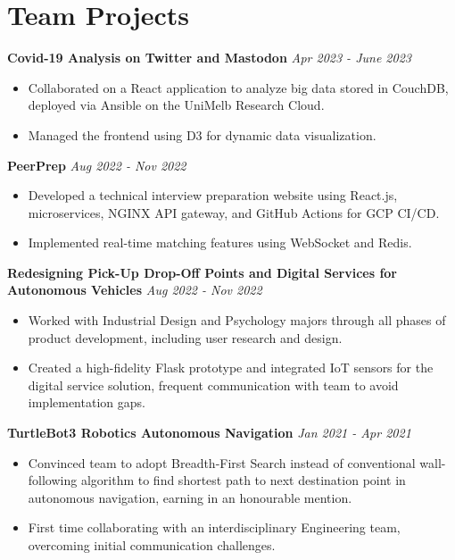 \documentclass[a4paper,10pt]{article}
\begin{document}
\section*{Team Projects}
\textbf{Covid-19 Analysis on Twitter and Mastodon} \hfill \textit{Apr 2023 - June 2023}
\begin{itemize}[leftmargin=*]
    \item Collaborated on a React application to analyze big data stored in CouchDB, deployed via Ansible on the UniMelb Research Cloud.
    \item Managed the frontend using D3 for dynamic data visualization.
\end{itemize}

\textbf{PeerPrep} \hfill \textit{Aug 2022 - Nov 2022}
\begin{itemize}[leftmargin=*]
    \item Developed a technical interview preparation website using React.js, microservices, NGINX API gateway, and GitHub Actions for GCP CI/CD.
    \item Implemented real-time matching features using WebSocket and Redis.
\end{itemize}

\textbf{Redesigning Pick-Up Drop-Off Points and Digital Services for Autonomous Vehicles} \hfill \textit{Aug 2022 - Nov 2022}
\begin{itemize}[leftmargin=*]
    \item Worked with Industrial Design and Psychology majors through all phases of product development, including user research and design.
    \item Created a high-fidelity Flask prototype and integrated IoT sensors for the digital service solution, frequent communication with team to avoid implementation gaps.
\end{itemize}

\textbf{TurtleBot3 Robotics Autonomous Navigation} \hfill \textit{Jan 2021 - Apr 2021}
\begin{itemize}[leftmargin=*]
    \item Convinced team to adopt Breadth-First Search instead of conventional wall-following algorithm to find shortest path to next destination point in autonomous navigation, earning in an honourable mention.
    \item First time collaborating with an interdisciplinary Engineering team, overcoming initial communication challenges.
\end{itemize}
\end{document}

